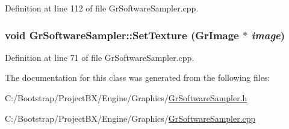 Definition at line 112 of file GrSoftwareSampler.cpp.\hypertarget{class_gr_software_sampler_a30cc8a865e185fc0c09c9eaa0f6071d}{
\subsubsection[{SetTexture}]{\setlength{\rightskip}{0pt plus 5cm}void GrSoftwareSampler::SetTexture ({\bf GrImage} $\ast$ {\em image})}}
\label{class_gr_software_sampler_a30cc8a865e185fc0c09c9eaa0f6071d}




Definition at line 71 of file GrSoftwareSampler.cpp.

The documentation for this class was generated from the following files:\begin{CompactItemize}
\item 
C:/Bootstrap/ProjectBX/Engine/Graphics/\hyperlink{_gr_software_sampler_8h}{GrSoftwareSampler.h}\item 
C:/Bootstrap/ProjectBX/Engine/Graphics/\hyperlink{_gr_software_sampler_8cpp}{GrSoftwareSampler.cpp}\end{CompactItemize}
